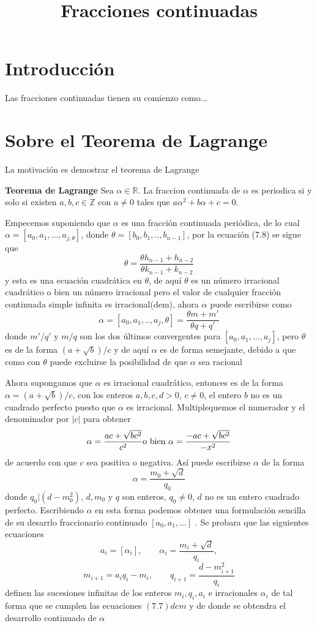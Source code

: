 \documentclass[11pt, article]{article}
\title{Fracciones continuadas}
\author{}
\date{}
\begin{document}
\maketitle
\thispagestyle{empty}
\section*{Introducción}
    Las fracciones continuadas tienen su comienzo como...
\section*{Sobre el Teorema de Lagrange}
    La motivación es demostrar el teorema de Lagrange

    \textbf{Teorema de Lagrange} Sea $\alpha \in \mathbb{R}$. La fraccion continuada de $\alpha$ es periodica si y solo si existen $a, b, c \in\mathbb{Z}$ con $a\not=0$ tales que $a\alpha^2 + b\alpha + c = 0$.

    Empecemos suponiendo que $\alpha$ es una fracción continuada periódica, de lo cual $\alpha= [a_0,a_1,...,a_{j,\theta}]$, donde $\theta=\overline{[b_0,b_1,..,b_{n-1}]}$, por la ecuación (7.8) se sigue que
        \[
        \theta =\dfrac{\theta h_{n-1}+h_{n-2}}{\theta k_{n-1}+k_{n-2}}
        \]
    y esta es una ecuación cuadrática en $\theta$, de aquí $\theta$ es un número irracional cuadrático o bien un número irracional pero el valor de cualquier fracción continuada simple infinita es irracional(dem), ahora $\alpha$ puede escribirse como 
        \[
        \alpha = [a_0,a_1,..,a_j,\theta]=\dfrac{\theta m + m'}{\theta q + q'}
        \]
    donde $m'/q'$ y $m/q$ son los dos últimos convergentes para $[a_0,a_1,...,a_j]$, pero $\theta$ es de la forma $(a + \sqrt{b})/c$ y de aquí $\alpha$ es de forma semejante, debido a que como con $\theta$ puede excluirse la posibilidad de que $\alpha$ sea racional

    Ahora supongamos que $\alpha$ es irracional cuadrático, entonces es de la forma $\alpha=(a+\sqrt{b})/c$, con los enteros $a,b,c,d>0$, $c\not=0$, el entero $b$ no es un cuadrado perfecto puesto que $\alpha$ es irracional. Multiplequemos el numerador y el denominador por $|c|$ para obtener 
        \[
        \alpha = \dfrac{ac + \sqrt{bc^2}}{c^2} \textnormal{o bien } \alpha=\dfrac{-ac+\sqrt{bc^2}}{-x^2}
        \]
    de acuerdo con que $c$ sea positiva o negativa. Así puede escribirse $\alpha$ de la forma
        \[
        \alpha = \dfrac{m_0+\sqrt{d}}{q_0}
        \]
    donde $q_0|(d-m_0^2)$, $d,m_0$ y $q$ son enteros, $q_0\not=0$, $d$ no es un entero cuadrado perfecto. Escribiendo $\alpha$ en esta forma podemos obtener una formulación sencilla de su desarrlo fraccionario continuado $\overline{[a_0,a_1,...]}$ . Se probara que las siguientes ecuaciones 
        \[
        a_i=[\alpha_i], \qquad \alpha_i=\dfrac{m_i+\sqrt{d}}{q_i},
        \]
        \[
        m_{i+1}=a_iq_i-m_i, \qquad q_{i+1}=\dfrac{d-m_{i+1}^2}{q_i}
        \]
    definen las sucesiones infinitas de los enteros $m_i,q_i,a_i$ e irracionales $\alpha_i$ de tal forma que se cumplen las ecuaciones $(7.7)dem$ y de donde se obtendra el desarrollo continuado de $\alpha$
\end{document}
